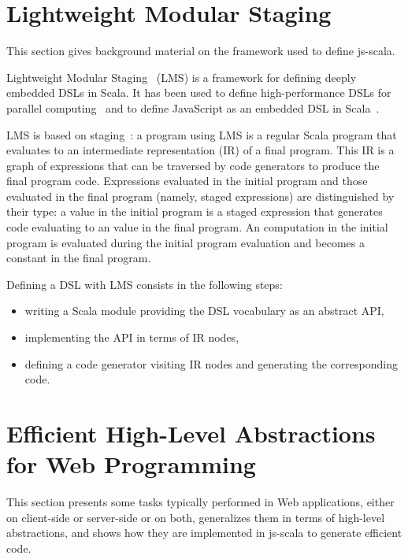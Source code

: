 \documentclass[preprint]{sigplanconf}
\begin{document}
\section{Lightweight Modular Staging}
\label{sec:lms}

This section gives background material on the framework used to define js-scala.

Lightweight Modular Staging~\cite{Rompf12_LMSThesis, Rompf12_LMS} (LMS) is a framework for defining
deeply embedded DSLs in Scala. It has been used to define high-performance DSLs for parallel
computing~\cite{Brown11_Parallel} and to define JavaScript as an embedded DSL in
Scala~\cite{Kossakowski12_JsDESL}.

LMS is based on staging~\cite{Jorring1986_Staging}: a program using LMS is a regular Scala program
that evaluates to an intermediate representation (IR) of a final program. This IR is a graph of
expressions that can be traversed by code generators to produce the final program code. Expressions
evaluated in the initial program and those evaluated in the final program (namely, staged
expressions) are distinguished by their type: a  value in the initial program is a
staged expression that generates code evaluating to an  value in the final program. An
 computation in the initial program is evaluated during the initial program evaluation and
becomes a constant in the final program.

Defining a DSL with LMS consists in the following steps:

\begin{itemize}
 \item writing a Scala module providing the DSL vocabulary as an abstract API,
 \item implementing the API in terms of IR nodes,
 \item defining a code generator visiting IR nodes and generating the corresponding code.
\end{itemize}

\section{Efficient High-Level Abstractions for Web Programming}
\label{sec:contribution}

This section presents some tasks typically performed in Web applications, either on client-side or
server-side or on both, generalizes them in terms of high-level abstractions, and shows how they are
implemented in js-scala to generate efficient code.
\end{document}
